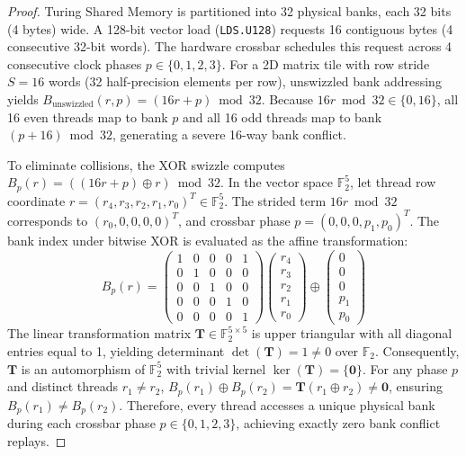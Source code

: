 \documentclass[10pt,twocolumn,letterpaper]{article}
\begin{document}
\begin{proof}
Turing Shared Memory is partitioned into 32 physical banks, each 32 bits (4 bytes) wide. A 128-bit vector load (\texttt{LDS.U128}) requests 16 contiguous bytes (4 consecutive 32-bit words). The hardware crossbar schedules this request across 4 consecutive clock phases $p \in \{0, 1, 2, 3\}$. For a 2D matrix tile with row stride $S=16$ words (32 half-precision elements per row), unswizzled bank addressing yields $B_{\text{unswizzled}}(r, p) = (16 r + p) \bmod 32$. Because $16 r \bmod 32 \in \{0, 16\}$, all 16 even threads map to bank $p$ and all 16 odd threads map to bank $(p+16) \bmod 32$, generating a severe 16-way bank conflict.

To eliminate collisions, the XOR swizzle computes $B_p(r) = ((16 r + p) \oplus r) \bmod 32$. In the vector space $\mathbb{F}_2^5$, let thread row coordinate $r = (r_4, r_3, r_2, r_1, r_0)^T \in \mathbb{F}_2^5$. The strided term $16 r \bmod 32$ corresponds to $(r_0, 0, 0, 0, 0)^T$, and crossbar phase $p = (0, 0, 0, p_1, p_0)^T$. The bank index under bitwise XOR is evaluated as the affine transformation:
\begin{equation}
B_p(r) = \begin{pmatrix}
1 & 0 & 0 & 0 & 1 \\
0 & 1 & 0 & 0 & 0 \\
0 & 0 & 1 & 0 & 0 \\
0 & 0 & 0 & 1 & 0 \\
0 & 0 & 0 & 0 & 1
\end{pmatrix}
\begin{pmatrix}
r_4 \\ r_3 \\ r_2 \\ r_1 \\ r_0
\end{pmatrix}
\oplus
\begin{pmatrix}
0 \\ 0 \\ 0 \\ p_1 \\ p_0
\end{pmatrix}
\end{equation}
The linear transformation matrix $\mathbf{T} \in \mathbb{F}_2^{5 \times 5}$ is upper triangular with all diagonal entries equal to 1, yielding determinant $\det(\mathbf{T}) = 1 \ne 0$ over $\mathbb{F}_2$. Consequently, $\mathbf{T}$ is an automorphism of $\mathbb{F}_2^5$ with trivial kernel $\ker(\mathbf{T}) = \{\mathbf{0}\}$. For any phase $p$ and distinct threads $r_1 \ne r_2$, $B_p(r_1) \oplus B_p(r_2) = \mathbf{T}(r_1 \oplus r_2) \ne \mathbf{0}$, ensuring $B_p(r_1) \ne B_p(r_2)$. Therefore, every thread accesses a unique physical bank during each crossbar phase $p \in \{0, 1, 2, 3\}$, achieving exactly zero bank conflict replays.
\end{proof}
\end{document}
